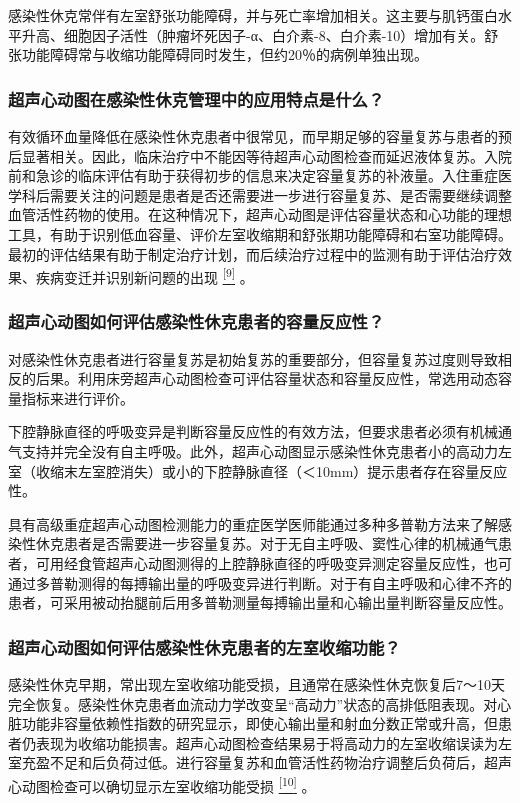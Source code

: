 感染性休克常伴有左室舒张功能障碍，并与死亡率增加相关。这主要与肌钙蛋白水平升高、细胞因子活性（肿瘤坏死因子-α、白介素-8、白介素-10）增加有关。舒张功能障碍常与收缩功能障碍同时发生，但约20％的病例单独出现。

\subsubsection{超声心动图在感染性休克管理中的应用特点是什么？}

有效循环血量降低在感染性休克患者中很常见，而早期足够的容量复苏与患者的预后显著相关。因此，临床治疗中不能因等待超声心动图检查而延迟液体复苏。入院前和急诊的临床评估有助于获得初步的信息来决定容量复苏的补液量。入住重症医学科后需要关注的问题是患者是否还需要进一步进行容量复苏、是否需要继续调整血管活性药物的使用。在这种情况下，超声心动图是评估容量状态和心功能的理想工具，有助于识别低血容量、评价左室收缩期和舒张期功能障碍和右室功能障碍。最初的评估结果有助于制定治疗计划，而后续治疗过程中的监测有助于评估治疗效果、疾病变迁并识别新问题的出现
\protect\hyperlink{text00009.htmlux5cux23ch9-8}{\textsuperscript{{[}9{]}}}
。

\subsubsection{超声心动图如何评估感染性休克患者的容量反应性？}

对感染性休克患者进行容量复苏是初始复苏的重要部分，但容量复苏过度则导致相反的后果。利用床旁超声心动图检查可评估容量状态和容量反应性，常选用动态容量指标来进行评价。

下腔静脉直径的呼吸变异是判断容量反应性的有效方法，但要求患者必须有机械通气支持并完全没有自主呼吸。此外，超声心动图显示感染性休克患者小的高动力左室（收缩末左室腔消失）或小的下腔静脉直径（＜10mm）提示患者存在容量反应性。

具有高级重症超声心动图检测能力的重症医学医师能通过多种多普勒方法来了解感染性休克患者是否需要进一步容量复苏。对于无自主呼吸、窦性心律的机械通气患者，可用经食管超声心动图测得的上腔静脉直径的呼吸变异测定容量反应性，也可通过多普勒测得的每搏输出量的呼吸变异进行判断。对于有自主呼吸和心律不齐的患者，可采用被动抬腿前后用多普勒测量每搏输出量和心输出量判断容量反应性。

\subsubsection{超声心动图如何评估感染性休克患者的左室收缩功能？}

感染性休克早期，常出现左室收缩功能受损，且通常在感染性休克恢复后7～10天完全恢复。感染性休克患者血流动力学改变呈“高动力”状态的高排低阻表现。对心脏功能非容量依赖性指数的研究显示，即使心输出量和射血分数正常或升高，但患者仍表现为收缩功能损害。超声心动图检查结果易于将高动力的左室收缩误读为左室充盈不足和后负荷过低。进行容量复苏和血管活性药物治疗调整后负荷后，超声心动图检查可以确切显示左室收缩功能受损
\protect\hyperlink{text00009.htmlux5cux23ch10-8}{\textsuperscript{{[}10{]}}}
。

